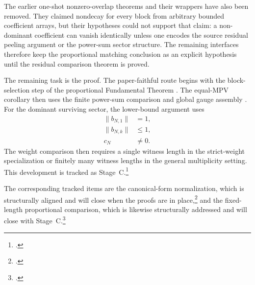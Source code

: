 \documentclass{article}
\begin{document}
The earlier one-shot nonzero-overlap theorems and their wrappers have also been
removed. They claimed nondecay for every block from arbitrary bounded
coefficient arrays, but their hypotheses could not support that claim: a
non-dominant coefficient can vanish identically unless one encodes the source
residual peeling argument or the power-sum sector structure. The remaining
\Lean{} interfaces therefore keep the proportional matching conclusion as an
explicit hypothesis until the residual comparison theorem is proved.

The remaining task is the proof. The paper-faithful route begins with the
block-selection step of the proportional Fundamental Theorem
\cite[line~1182]{Cirac2016MPDO_arXiv}. The equal-MPV corollary then uses the
finite power-sum comparison and global gauge assembly
\cite[lines~1184--1192]{Cirac2016MPDO_arXiv}. For the dominant surviving
sector, the lower-bound argument uses
\begin{align}
    \lVert b_{N,1}\rVert
        &= 1,
    \label{eq:cpsv16_cf_normalization_and_proportional_comparison_dominant_coefficient_norm}\\
    \lVert b_{N,k}\rVert
        &\leq 1,
    \label{eq:cpsv16_cf_normalization_and_proportional_comparison_bounded_coefficient_norm}\\
    c_N
        &\neq 0.
    \label{eq:cpsv16_cf_normalization_and_proportional_comparison_nonzero_per_length_scalar}
\end{align}
The weight comparison then requires a single witness length in the strict-weight
specialization or finitely many witness lengths in the general multiplicity
setting. This development is tracked as Stage~C.\footnote{.}

The corresponding tracked items are the canonical-form normalization, which is
structurally aligned and will close when the proofs are in place,\footnote{%
.} and the fixed-length proportional comparison, which is
likewise structurally addressed and will close with Stage~C.\footnote{%
.}



\end{document}
